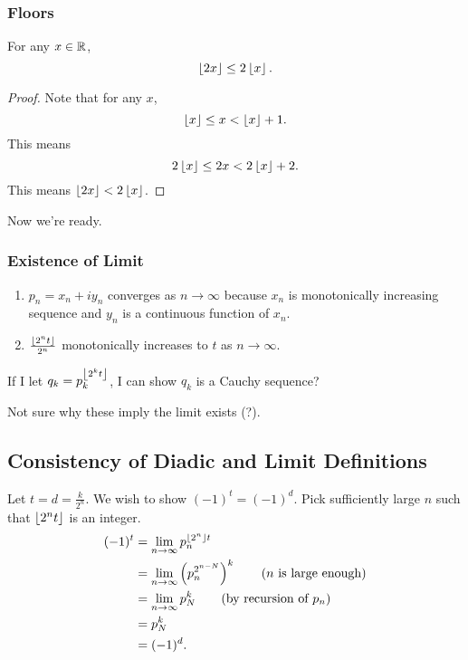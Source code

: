 \subsubsection{Floors}
\begin{theorem}
    For any $x \in \operatorname{\mathbb{R}}$,
    \[ \left \lfloor{2x}\right \rfloor \le 2\left \lfloor{x}\right \rfloor. \]
\end{theorem}

\begin{proof}
    Note that for any $x$,
    \[ \left \lfloor{x}\right \rfloor \le x < \left \lfloor{x}\right \rfloor + 1. \]
    This means 
    \[ 2\left \lfloor{x}\right \rfloor \le 2x < 2\left \lfloor{x}\right \rfloor + 2. \]
    This means $\left \lfloor{2x}\right \rfloor < 2\left \lfloor{x}\right \rfloor$.
\end{proof}

Now we're ready.

\subsubsection{Existence of Limit}






\begin{enumerate}
    \item $p_n = x_n + iy_n$ converges as $n \to \infty$
        because $x_n$ is monotonically increasing sequence
        and $y_n$ is a continuous function of $x_n$.

    \item $\frac{\left \lfloor{2^nt}\right \rfloor}{2^n}$ monotonically increases
        to $t$ as $n \to \infty$.
\end{enumerate}

If I let $q_k = p_k^{\left \lfloor{2^kt}\right \rfloor}$, I can show $q_k$ is
a Cauchy sequence?

Not sure why these imply the limit exists (?).

\subsection{Consistency of Diadic and Limit Definitions}

Let $t = d = \frac{k}{2^n}$.
We wish to show $(-1)^t = (-1)^d$.
Pick sufficiently large $n$ such that $\left \lfloor{2^n t}\right \rfloor$ is
an integer.
\begin{align*}
    (-1)^t &= \lim_{n \to \infty} p_n^{\left \lfloor{2^n}\right \rfloor t} \\
    &= \lim_{n \to \infty} \left( p_n^{2^{n-N}} \right)^k 
    \tag{$n$ is large enough}\\
    &= \lim_{n \to \infty} p_N^k 
    \tag{by recursion of $p_n$}\\
    &= p_N^k \\
    &= (-1)^d.
\end{align*}

